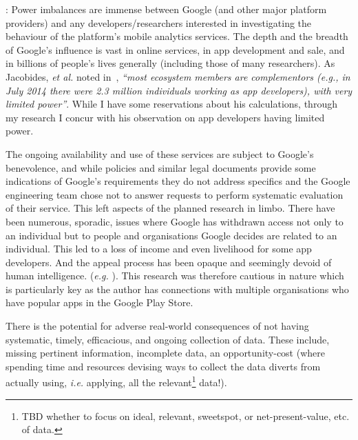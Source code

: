 : 
Power imbalances are immense between Google (and other major platform providers) and any developers/researchers interested in investigating the behaviour of the platform's mobile analytics services.
%
The depth and the breadth of Google's influence is vast in online services, in app development and sale, and in billions of people's lives generally (including those of many researchers). As Jacobides, \emph{et al.} noted in~, \emph{``most ecosystem members are complementors (e.g., in July
2014 there were 2.3 million individuals working as app developers), with very limited power''}. While I have some reservations about his calculations, through my research I concur with his observation on app developers having limited power. %

The ongoing availability and use of these services are subject to Google's benevolence, and while policies and similar legal documents provide some indications of Google's requirements they do not address specifics and the Google engineering team chose not to answer requests to perform systematic evaluation of their service. This left aspects of the planned research in limbo. There have been numerous, sporadic, issues where Google has withdrawn access not only to an individual but to people and organisations Google decides are related to an individual. This led to a loss of income and even livelihood for some app developers. And the appeal process has been opaque and seemingly devoid of human intelligence.  (\emph{e.g.} ). This research was therefore cautious in nature which is particularly key as the author has connections with multiple organisations who have popular apps in the Google Play Store. 

There is the potential for adverse real-world consequences of not having systematic, timely, efficacious, and ongoing collection of data. These include, missing pertinent information, incomplete data, an opportunity-cost (where spending time and resources devising ways to collect the data diverts from actually using, \emph{i.e.} applying, all the relevant\footnote{TBD whether to focus on ideal, relevant, sweetspot, or net-present-value, etc. of data.} data!). 

